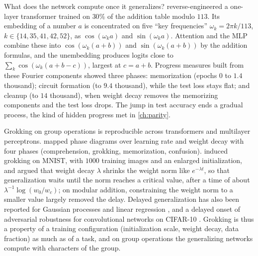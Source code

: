 \begin{refsection}

What does the network compute once it generalizes? \Textcite{NandaEtAl2023} reverse-engineered a one-layer transformer trained on $30\%$ of the addition table modulo $113$. Its embedding of a number $a$ is concentrated on five ``key frequencies'' $\omega_k=2\pi k/113$, $k\in\{14,35,41,42,52\}$, as $\cos(\omega_ka)$ and $\sin(\omega_ka)$. Attention and the MLP combine these into $\cos(\omega_k(a+b))$ and $\sin(\omega_k(a+b))$ by the addition formulas, and the unembedding produces logits close to $\sum_k\cos(\omega_k(a+b-c))$, largest at $c=a+b$. Progress measures built from these Fourier components showed three phases: memorization (epochs $0$ to $1.4$ thousand); circuit formation (to $9.4$ thousand), while the test loss stays flat; and cleanup (to $14$ thousand), when weight decay removes the memorizing components and the test loss drops. The jump in test accuracy ends a gradual process, the kind of hidden progress met in \cref{ch:parity}.

Grokking on group operations is reproducible across transformers and multilayer perceptrons. \Textcite{LiuEtAl2022} mapped phase diagrams over learning rate and weight decay with four phases (comprehension, grokking, memorization, confusion). \Textcite{LiuEtAl2023} induced grokking on MNIST, with $1000$ training images and an enlarged initialization, and argued that weight decay $\lambda$ shrinks the weight norm like $e^{-\lambda t}$, so that generalization waits until the norm reaches a critical value, after a time of about $\lambda^{-1}\log(w_0/w_c)$; on modular addition, constraining the weight norm to a smaller value largely removed the delay. Delayed generalization has also been reported for Gaussian processes and linear regression \parencite{MillerEtAl2024}, and a delayed onset of adversarial robustness for convolutional networks on CIFAR-10 \parencite{HumayunEtAl2024}. Grokking is thus a property of a training configuration (initialization scale, weight decay, data fraction) as much as of a task, and on group operations the generalizing networks compute with characters of the group.


\end{refsection}
